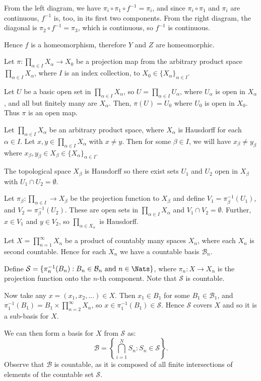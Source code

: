 \documentclass{homework651}
\newcommand\ra{\rightarrow}
\newcommand\calB{\mathcal{B}}
\newcommand\calS{\mathcal{S}}
\begin{document}
\begin{aproblems}
From the left diagram,
we have $\pi_i \circ \pi_1 \circ f^{-1} = \pi_i$, and since $\pi_i\circ\pi_1$
and $\pi_i$ are continuous, $f^{-1}$ is, too, in its first two components.
From the right diagram, the diagonal is $\pi_2\circ f^{-1}=\pi_3$, which is
continuous, so $f^{-1}$ is continuous.

Hence $f$ is a homeomorphism, therefore $Y$ and $Z$ are homeomorphic.

\newpage

\subsol
Let $\pi: \prod_{\alpha\in I} X_\alpha \ra X_0$ be a projection map from
the arbitrary product space $\prod_{\alpha\in I} X_\alpha$, where $I$ is an index
collection, to $X_0\in\{X_\alpha\}_{\alpha\in I}$.

Let $U$ be a basic open set in $\prod_{\alpha\in I} X_\alpha$,
so $U=\prod_{\alpha\in I} U_\alpha$,
where $U_\alpha$ is open in $X_\alpha$, and all but finitely many
are $X_\alpha$.  Then, $\pi(U)=U_0$ where $U_0$
is open in $X_0$.  Thus $\pi$ is an open map.

\subsol
Let $\prod_{\alpha\in I} X_\alpha$ be an arbitrary product space,
where $X_\alpha$ is
Hausdorff for each $\alpha\in I$.  Let $x,y\in\prod_{\alpha\in I} X_\alpha$
with $x\ne y$.
Then for some $\beta\in I$, we will have $x_\beta\ne y_\beta$ where
$x_\beta,y_\beta\in X_\beta\in\{X_\alpha\}_{\alpha\in I}$.

The topological space $X_\beta$ is Hausdorff so there exist sets $U_1$ and
$U_2$ open in $X_\beta$ with $U_1\cap U_2=\emptyset$.

Let $\pi_\beta:\prod_{\alpha\in I}\ra X_\beta$ be the projection function
to $X_\beta$ and define 
$V_1= \pi_\beta^{-1}(U_1)$,
and
$V_2=\pi_\beta^{-1}(U_2)$.
These are open sets
in $\prod_{\alpha\in I} X_\alpha$ and $V_1\cap V_2=\emptyset$.  Further,
$x\in V_1$ and $y\in V_2$, so $\prod_{\alpha\in X_\alpha}$ is Hausdorff.

\vspace{.3in}

\subsol
Let $X=\prod_{n=1}^{\infty} X_n$ be a product of countably many spaces
$X_n$, where each $X_n$ is second countable.  Hence for each $X_n$ we have
a countable basis $\calB_n$.

Define $\calS=\{\pi_n^{-1}(B_n):B_n\in\calB_n \text{ and } n\in\Nats\}$,
where $\pi_n:X\ra X_n$ is the projection function onto the $n$-th component.
Note that $\calS$ is countable.

Now take any $x=(x_1,x_2,...)\in X$.  Then $x_1\in B_1$
for some $B_1\in\calB_1$, and $\pi_1^{-1}(B_1)=B_1\times\prod_{n=2}^{\infty} X_n$,
so $x\in \pi_1^{-1}(B_1)\in\calS$.  Hence $\calS$ covers $X$ and so it
is a sub-basis for $X$.

We can then form a basis for $X$ from $\calS$ as:
$$ \calB = \left\{ \bigcap_{i=1}^{N} S_n : S_n\in\calS\right\}.$$
Observe that $\calB$ is countable, as it is composed of all finite intersections
of elements of the countable set $\calS$.

\end{aproblems}
\end{document}
